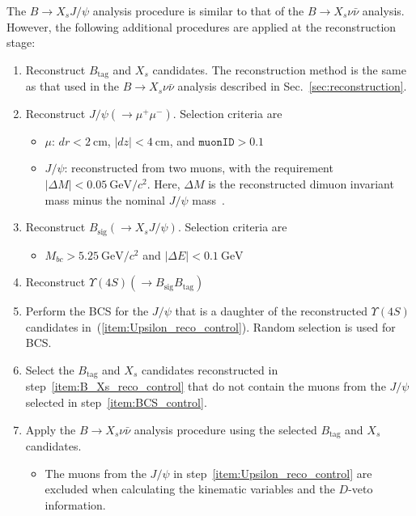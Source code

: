 The $B\rightarrow X_sJ/\psi$ analysis procedure is similar to that of the $B\rightarrow X_s\nu\bar{\nu}$ analysis.
However, the following additional procedures are applied at the reconstruction stage:
\begin{enumerate}
  \item Reconstruct $B_{\textrm{tag}}$ and $X_{s}$ candidates. The reconstruction method is the same as that used in the $B\rightarrow X_s\nu\bar{\nu}$ analysis described in Sec.~\ref{sec:reconstruction}.
  \label{item:B_Xs_reco_control}
  \item Reconstruct $J/\psi(\rightarrow\mu^{+}\mu^{-})$. Selection criteria are
  \begin{itemize}
    \item $\mu$: $dr < 2~\textrm{cm}$, $\left| dz \right| < 4~\textrm{cm}$, and $\texttt{muonID} > 0.1$
    \item$J/\psi$: reconstructed from two muons, with the requirement $\left|\Delta M\right|<0.05~\textrm{GeV}/c^{2}$. Here, $\Delta M$ is the reconstructed dimuon invariant mass minus the nominal $J/\psi$ mass~\cite{ParticleDataGroup:2024cfk}.
  \end{itemize}
  \item Reconstruct $B_{\textrm{sig}}(\rightarrow X_{s}J/\psi)$. Selection criteria are
  \begin{itemize}
    \item $M_{bc} > 5.25~\textrm{GeV}/c^{2}$ and $\left| \Delta E \right| < 0.1~\textrm{GeV}$
  \end{itemize}
  \item Reconstruct $\Upsilon(4S)(\rightarrow B_{\textrm{sig}}B_{\textrm{tag}})$
  \label{item:Upsilon_reco_control}
  \item Perform the BCS for the $J/\psi$ that is a daughter of the reconstructed $\Upsilon(4S)$ candidates in~(\ref{item:Upsilon_reco_control}). Random selection is used for BCS.
  \label{item:BCS_control}
  \item Select the $B_{\textrm{tag}}$ and $X_{s}$ candidates reconstructed in step~\ref{item:B_Xs_reco_control} that do not contain the muons from the $J/\psi$ selected in step~\ref{item:BCS_control}.
  \label{item:selected_B_Xs_control}
  \item Apply the $B\rightarrow X_{s}\nu\bar{\nu}$ analysis procedure using the selected $B_{\textrm{tag}}$ and $X_{s}$ candidates.
  \begin{itemize}
    \item The muons from the $J/\psi$ in step~\ref{item:Upsilon_reco_control} are excluded when calculating the kinematic variables and the $D$-veto information.
  \end{itemize}
\end{enumerate}
